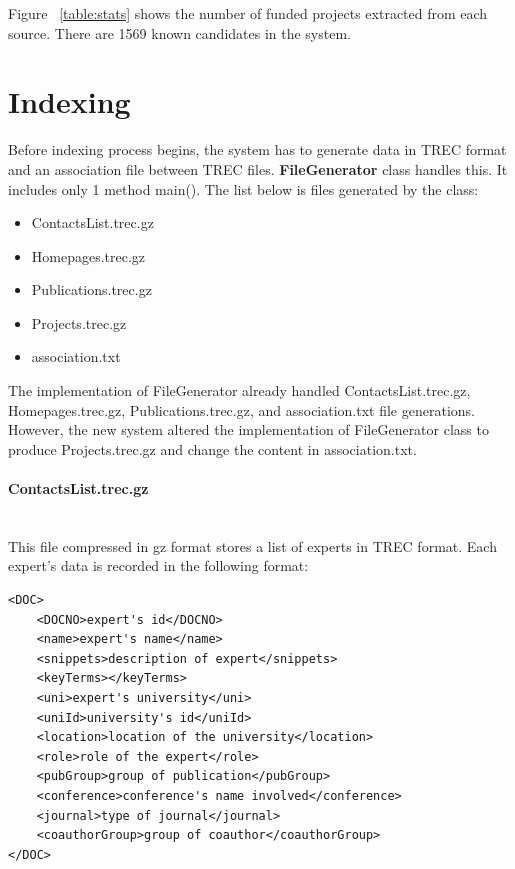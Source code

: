 \begin{table}
\centering
{}
\caption{The number of funded projects extracted from each source} \label{table:stats}
\end{table}
Figure ~\ref{table:stats} shows the number of funded projects extracted from each source. There are 1569 known candidates in the system.

\section{Indexing}\label{sec:indexingImpl}

Before indexing process begins, the system has to generate data in TREC format and an association file between TREC files. \textbf{FileGenerator} class
handles this. It includes only 1 method main(). The list below is files generated by the class:
\begin{itemize}
 \item ContactsList.trec.gz
 \item Homepages.trec.gz
 \item Publications.trec.gz
 \item Projects.trec.gz
 \item association.txt
\end{itemize}

The implementation of FileGenerator already handled ContactsList.trec.gz, Homepages.trec.gz, Publications.trec.gz, and association.txt file generations.
However, the new system altered the implementation of FileGenerator class to produce Projects.trec.gz and change the content in association.txt.

\paragraph{ContactsList.trec.gz} \hspace{0pt} \\
This file compressed in gz format stores a list of experts in TREC format. Each expert's data is recorded in the following format:
\begin{verbatim}
<DOC>
	<DOCNO>expert's id</DOCNO>
	<name>expert's name</name>
	<snippets>description of expert</snippets>
	<keyTerms></keyTerms>
	<uni>expert's university</uni>
	<uniId>university's id</uniId>
	<location>location of the university</location>
	<role>role of the expert</role>
	<pubGroup>group of publication</pubGroup>
	<conference>conference's name involved</conference>
	<journal>type of journal</journal>
	<coauthorGroup>group of coauthor</coauthorGroup>
</DOC>
\end{verbatim}

